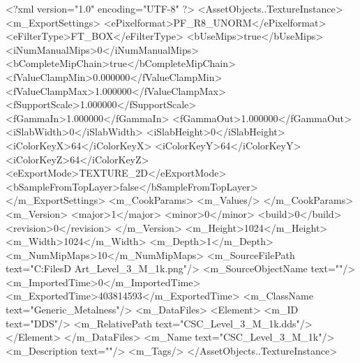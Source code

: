 <?xml version="1.0" encoding="UTF-8" ?>
<AssetObjects..TextureInstance>
	<m_ExportSettings>
		<ePixelformat>PF_R8_UNORM</ePixelformat>
		<eFilterType>FT_BOX</eFilterType>
		<bUseMips>true</bUseMips>
		<iNumManualMips>0</iNumManualMips>
		<bCompleteMipChain>true</bCompleteMipChain>
		<fValueClampMin>0.000000</fValueClampMin>
		<fValueClampMax>1.000000</fValueClampMax>
		<fSupportScale>1.000000</fSupportScale>
		<fGammaIn>1.000000</fGammaIn>
		<fGammaOut>1.000000</fGammaOut>
		<iSlabWidth>0</iSlabWidth>
		<iSlabHeight>0</iSlabHeight>
		<iColorKeyX>64</iColorKeyX>
		<iColorKeyY>64</iColorKeyY>
		<iColorKeyZ>64</iColorKeyZ>
		<eExportMode>TEXTURE_2D</eExportMode>
		<bSampleFromTopLayer>false</bSampleFromTopLayer>
	</m_ExportSettings>
	<m_CookParams>
		<m_Values/>
	</m_CookParams>
	<m_Version>
		<major>1</major>
		<minor>0</minor>
		<build>0</build>
		<revision>0</revision>
	</m_Version>
	<m_Height>1024</m_Height>
	<m_Width>1024</m_Width>
	<m_Depth>1</m_Depth>
	<m_NumMipMaps>10</m_NumMipMaps>
	<m_SourceFilePath text="C:\Users\Shadow\Desktop\Working Files\3D Art\CSC_Level_3_M_1k.png"/>
	<m_SourceObjectName text=""/>
	<m_ImportedTime>0</m_ImportedTime>
	<m_ExportedTime>403814593</m_ExportedTime>
	<m_ClassName text="Generic_Metalness"/>
	<m_DataFiles>
		<Element>
			<m_ID text="DDS"/>
			<m_RelativePath text="CSC_Level_3_M_1k.dds"/>
		</Element>
	</m_DataFiles>
	<m_Name text="CSC_Level_3_M_1k"/>
	<m_Description text=""/>
	<m_Tags/>
</AssetObjects..TextureInstance>

